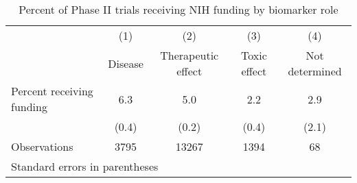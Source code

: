 \begin{table}[htbp]\centering
\caption{Percent of Phase II trials receiving NIH funding by biomarker role}
\begin{tabular}{l*{4}{c}}
\hline\hline
                    &\multicolumn{1}{c}{(1)}&\multicolumn{1}{c}{(2)}&\multicolumn{1}{c}{(3)}&\multicolumn{1}{c}{(4)}\\
                    &\multicolumn{1}{c}{Disease}&\multicolumn{1}{c}{Therapeutic effect}&\multicolumn{1}{c}{Toxic effect}&\multicolumn{1}{c}{Not determined}\\
\hline
Percent receiving funding&         6.3&         5.0&         2.2&         2.9\\
                    &       (0.4)&       (0.2)&       (0.4)&       (2.1)\\
\hline
Observations        &        3795&       13267&        1394&          68\\
\hline\hline
\multicolumn{5}{l}{\footnotesize Standard errors in parentheses}\\
\end{tabular}
\end{table}
